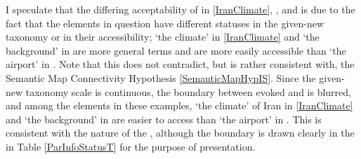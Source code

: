 I speculate that the differing acceptability of  in \ref{IranClimate}, \LLast, and \Last is due to the fact that the elements in question have different statuses in the given-new taxonomy or in their accessibility;
`the climate' in \ref{IranClimate} and `the background' in \LLast are more general terms and are more easily accessible
than `the airport' in \Last.
Note that this does not contradict, but is rather consistent with, the Semantic Map Connectivity Hypothesis \ref{SemanticMapHypIS}.
Since the given-new taxonomy scale is continuous,
the boundary between evoked and  is blurred, and
among the  elements in these examples,
`the climate' of Iran in \ref{IranClimate} and `the background' in \LLast are easier to access than `the airport' in \Last.
This is consistent with the nature of the ,
although the boundary is drawn clearly in the  in Table \ref{ParInfoStatusT}
for the purpose of presentation.

